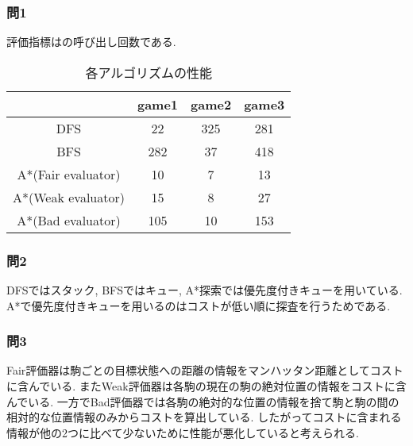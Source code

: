\documentclass[uplatex,a4j,11pt,dvipdfmx]{jsarticle}
\begin{document}
\title{}
\author{61908697 佐々木良輔}
\date{}
\maketitle
\subsubsection*{問1}
評価指標はの呼び出し回数である.
\begin{table}[h]
\caption{各アルゴリズムの性能}
\label{tab:eval}
\centering
\begin{tabular}{c|ccc}
\hline
&game1&game2&game3\\
\hline \hline
DFS&22&325&281\\
BFS&282&37&418\\
A*(Fair evaluator)&10 &7  &13\\
A*(Weak evaluator)&15 &8  &27\\
A*(Bad evaluator) &105&10 &153\\
\hline
\end{tabular}
\end{table}
\subsubsection*{問2}
DFSではスタック, BFSではキュー, A*探索では優先度付きキューを用いている.
A*で優先度付きキューを用いるのはコストが低い順に探査を行うためである.
\subsubsection*{問3}
Fair評価器は駒ごとの目標状態への距離の情報をマンハッタン距離としてコストに含んでいる.
またWeak評価器は各駒の現在の駒の絶対位置の情報をコストに含んでいる.
一方でBad評価器では各駒の絶対的な位置の情報を捨て駒と駒の間の相対的な位置情報のみからコストを算出している.
したがってコストに含まれる情報が他の2つに比べて少ないために性能が悪化していると考えられる.
\end{document}
